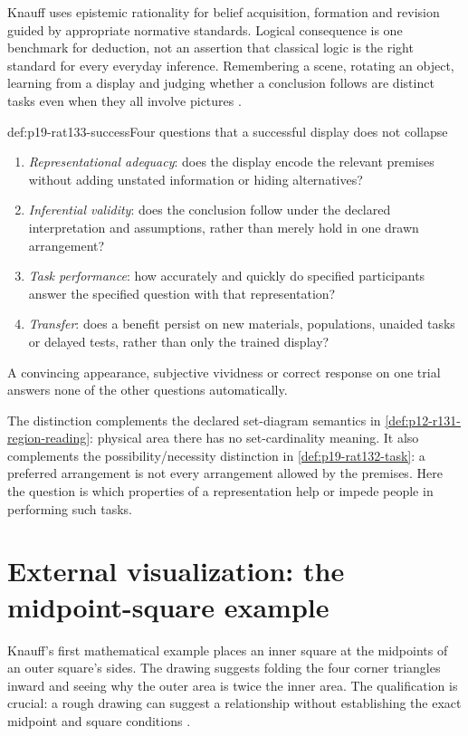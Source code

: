 Knauff uses epistemic rationality for belief acquisition, formation and
revision guided by appropriate normative standards. Logical consequence is
one benchmark for deduction, not an assertion that classical logic is the
right standard for every everyday inference. Remembering a scene, rotating
an object, learning from a display and judging whether a conclusion follows
are distinct tasks even when they all involve pictures
\parencite[pp.~735--736]{Knauff2021VisualizationRationality}.

\begin{hbdefinition}{def:p19-rat133-success}{Four questions that a successful display does not collapse}
\begin{enumerate}
\item \emph{Representational adequacy}: does the display encode the relevant
      premises without adding unstated information or hiding alternatives?
\item \emph{Inferential validity}: does the conclusion follow under the
      declared interpretation and assumptions, rather than merely hold in
      one drawn arrangement?
\item \emph{Task performance}: how accurately and quickly do specified
      participants answer the specified question with that representation?
\item \emph{Transfer}: does a benefit persist on new materials, populations,
      unaided tasks or delayed tests, rather than only the trained display?
\end{enumerate}
A convincing appearance, subjective vividness or correct response on one
trial answers none of the other questions automatically.
\end{hbdefinition}

The distinction complements the declared set-diagram semantics in
\cref{def:p12-r131-region-reading}: physical area there has no set-cardinality
meaning. It also complements the possibility/necessity distinction in
\cref{def:p19-rat132-task}: a preferred arrangement is not every
arrangement allowed by the premises. Here the question is which properties
of a representation help or impede people in performing such tasks.

\section{External visualization: the midpoint-square example}
\label{sec:p19-rat133-external}

Knauff's first mathematical example places an inner square at the midpoints
of an outer square's sides. The drawing suggests folding the four corner
triangles inward and seeing why the outer area is twice the inner area.
The qualification is crucial: a rough drawing can suggest a relationship
without establishing the exact midpoint and square conditions
\parencite[p.~736, fig.~13.3.1]{Knauff2021VisualizationRationality}.

